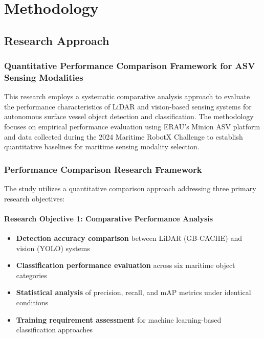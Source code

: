 \documentclass{erauthesis}
\begin{document}

\chapter{Methodology}

\section{Research Approach}

\subsection{Quantitative Performance Comparison Framework for ASV Sensing Modalities}

This research employs a systematic comparative analysis approach to evaluate the performance characteristics of LiDAR and vision-based sensing systems for autonomous surface vessel object detection and classification. The methodology focuses on empirical performance evaluation using ERAU's Minion ASV platform and data collected during the 2024 Maritime RobotX Challenge to establish quantitative baselines for maritime sensing modality selection.

\subsection{Performance Comparison Research Framework}

The study utilizes a quantitative comparison approach addressing three primary research objectives:

\subsubsection{Research Objective 1: Comparative Performance Analysis}
\begin{itemize}
\item \textbf{Detection accuracy comparison} between LiDAR (GB-CACHE) and vision (YOLO) systems
\item \textbf{Classification performance evaluation} across six maritime object categories
\item \textbf{Statistical analysis} of precision, recall, and mAP metrics under identical conditions
\item \textbf{Training requirement assessment} for machine learning-based classification approaches
\end{itemize}
\end{document}
